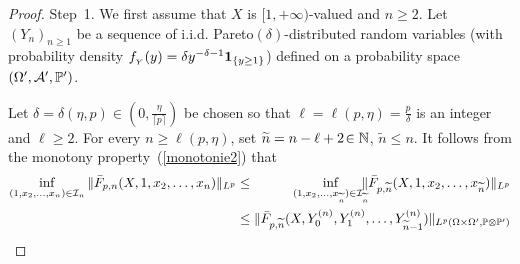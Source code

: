 \begin{proof} 
%
{\sc Step~1.} 
%
We first assume that $X$ is $[1,+\infty)$-valued and $n\ge 2$. Let $(Y_n)_{n\ge1}$ be a sequence of i.i.d. Pareto$(\delta)$-distributed random variables (with probability density $f_{_Y}(y) =\delta y^{-\delta-1}\mbox{\bf 1}_{\{y\ge 1\}}$) defined on a probability space $(\Omega',{\cal A}', \mathbb{P}')$. 
%
%

\smallskip Let $\delta=\delta(\eta,p)\!\in (0,\frac{\eta}{\lceil p \rceil})$ be chosen so that $\ell=\ell(p,\eta)=\frac{p}{\delta}$  is an integer and $\ell\ge 2$. 
 For every $n\ge \ell(p,\eta)$, set $\widetilde n= n-\ell+2\!\in \mathbb{N}$, $\widetilde n\le n$. It follows from the monotony property~(\ref{monotonie2}) that
\begin{eqnarray*}
\inf _{(1, x_2,\ldots,x_n)\in {\cal I}_n}\| \bar F_{p,n} (X, 1,x_2,\ldots,x_n) \|_{L^p}& \le & \hskip -0.25 cm \inf_{(1,x_2,\ldots,x_{\widetilde n})\in {\cal I}_{\widetilde n}} \hskip -0.25 cm\|\bar F_{p,\widetilde n }(X,1,x_2,\ldots,x_{\widetilde n})\|_{L^p}\\
&\le& \hskip -0.25 cm\|\bar F_{p,\widetilde n}(X,Y^{(n)}_0,Y^{(n)}_1,\ldots,Y^{(n)}_{\widetilde n-1})\|_{L^p(\Omega\times \Omega', \Prob\otimes \Prob')}
\end{eqnarray*}


\end{proof}
